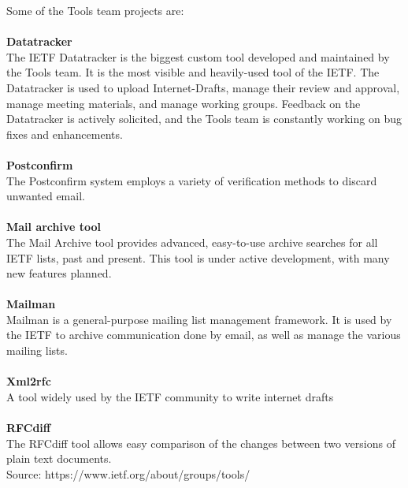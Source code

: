 \documentclass[a4paper,english]{report}
\begin{document}
Some of the Tools team projects are: \\\\
\textbf{Datatracker}\\
The IETF Datatracker is the biggest custom tool developed and maintained by the Tools team. It is the most visible and heavily-used tool of the IETF. The Datatracker is used to upload Internet-Drafts, manage their review and approval, manage meeting materials, and manage working groups. Feedback on the Datatracker is actively solicited, and the Tools team is constantly working on bug fixes and enhancements.\\
\\\textbf{Postconfirm}\\
The Postconfirm system employs a variety of verification methods to discard unwanted email.\\
\\\textbf{Mail archive tool}\\
The Mail Archive tool provides advanced, easy-to-use archive searches for all IETF lists, past and present. This tool is under active development, with many new features planned.\\
\\\textbf{Mailman}\\
Mailman is a general-purpose mailing list management framework. It is used by the IETF to archive communication done by email, as well as manage the various mailing lists.\\
\\\textbf{Xml2rfc}\\
A tool widely used by the IETF community to write internet drafts \\
\\\textbf{RFCdiff}\\
The RFCdiff tool allows easy comparison of the changes between two versions of plain text documents.\\

Source: https://www.ietf.org/about/groups/tools/
\end{document}
